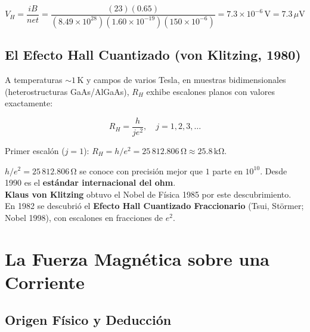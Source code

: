 \documentclass[12pt, letterpaper]{report}
\numberwithin{equation}{section}
\newcommand{\un}[1]{\,\mathrm{#1}}            %
\begin{document}
\begin{tcolorbox}[exbox,
  title=Ejemplo — Cinta de Cu ($t=150\,\mu\mathrm{m}$,
  $B=0.65\un{T}$, $i=23\un{A}$; $n=8.49\times10^{28}\un{m}^{-3}$)]
  \[
    V_H = \frac{iB}{net}
        = \frac{(23)(0.65)}
               {(8.49\times10^{28})(1.60\times10^{-19})(150\times10^{-6})}
        = 7.3\times10^{-6}\un{V} = 7.3\,\mu\mathrm{V}
  \]
\end{tcolorbox}

\subsection{El Efecto Hall Cuantizado (von Klitzing, 1980)}

A temperaturas $\sim1\un{K}$ y campos de varios Tesla, en muestras
bidimensionales (heterostructuras GaAs/AlGaAs), $R_H$ exhibe escalones
planos con valores exactamente:

\begin{equation}
  \boxed{R_H = \frac{h}{je^2},\quad j=1,2,3,\ldots}
  \label{eq:HallQ}
\end{equation}

Primer escalón ($j=1$): $R_H=h/e^2=25\,812.806\un{\Omega}\approx25.8\un{k\Omega}$.

\begin{tcolorbox}[propbox, title=Importancia metrológica — Premio Nobel 1985]
  $h/e^2=25\,812.806\un{\Omega}$ se conoce con precisión mejor que
  $1$ parte en $10^{10}$. Desde 1990 es el \textbf{estándar internacional
  del ohm}.\\[4pt]
  \textbf{Klaus von Klitzing} obtuvo el Nobel de Física 1985 por este
  descubrimiento.\\[4pt]
  En 1982 se descubrió el \textbf{Efecto Hall Cuantizado Fraccionario}
  (Tsui, Störmer; Nobel 1998), con escalones en fracciones de $e^2$.
\end{tcolorbox}

\section{La Fuerza Magnética sobre una Corriente}

\subsection{Origen Físico y Deducción}
\end{document}
